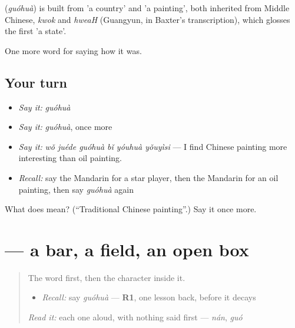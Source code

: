 \begin{cousinweb}
\textbf{} (\emph{guóhuà}) is built from  'a country' and  'a painting', both inherited from Middle Chinese, \emph{kwok} and \emph{hweaH} (Guangyun, in Baxter's transcription), which glosses the first 'a state'.
\end{cousinweb}

\begin{grammarlens}[title={What you've built}]
One more word for saying how it was.
\end{grammarlens}

\subsection*{Your turn}
\begin{itemize}
\raggedright
  \item \emph{Say it:} \emph{guóhuà}
  \item \emph{Say it:} \emph{guóhuà}, once more
  \item \emph{Say it:} \emph{wǒ juéde guóhuà bǐ yóuhuà yǒuyìsi} — I find Chinese painting more interesting than oil painting.
  \item \emph{Recall:} say the Mandarin for a star player, then the Mandarin for an oil painting, then say \emph{guóhuà} again
\end{itemize}

\begin{tcolorbox}[breakable,colback=teal!4,colframe=teal!35!black,title={Before you move on}]
What does  mean? (\textquotedblleft{}Traditional Chinese painting\textquotedblright{}.) Say it once more.
\end{tcolorbox}
\section[\texorpdfstring{\zh{画} (huà)}{画 (huà)}]{ — a bar, a field, an open box}

\label{lesson:ZH-W502-hua-paint}



\begin{quote}
The word first, then the character inside it.

\begin{itemize}
\raggedright
  \item \emph{Recall:} say \emph{guóhuà} — \textbf{R1}, one lesson back, before it decays
\end{itemize}

\begin{quote}
 
\end{quote}

\emph{Read it:} each one aloud, with nothing said first — \emph{nán}, \emph{guó}
\end{quote}

